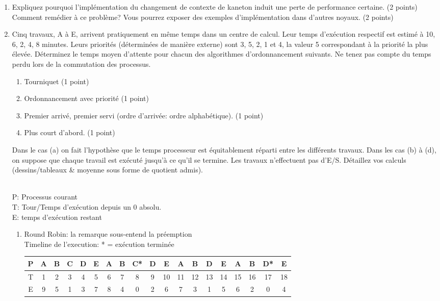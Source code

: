 \begin{enumerate}

\item Expliquez pourquoi l'implémentation du changement de contexte de
      kaneton induit une perte de performance certaine. (2 points) \\
      Comment remédier à ce problème? Vous pourrez exposer des exemples
      d'implémentation dans d'autres noyaux. (2 points)

\item Cinq travaux, A à E, arrivent pratiquement en même temps dans un centre de calcul. Leur temps d'exécution respectif est estimé à 10, 6, 2, 4, 8 minutes. Leurs priorités (déterminées de manière externe) sont 3, 5, 2, 1 et 4, la valeur 5 correspondant à la priorité la plus élevée. Déterminez le temps moyen d'attente pour chacun des algorithmes d'ordonnancement suivants. Ne tenez pas compte du temps perdu lors de la commutation des processus.
  \begin{enumerate}
  \item Tourniquet (1 point)
  \item Ordonnancement avec priorité (1 point)
  \item Premier arrivé, premier servi (ordre d'arrivée: ordre alphabétique). (1 point)
  \item Plus court d'abord. (1 point)
  \end{enumerate}
Dans le cas (a) on fait l'hypothèse que le temps processeur est équitablement réparti entre les différents travaux. Dans les cas (b) à (d), on suppose que chaque travail est exécuté jusqu'à ce qu'il se termine. Les travaux n'effectuent pas d'E/S. Détaillez vos calculs (dessins/tableaux \& moyenne sous forme de quotient admis).

\begin{correction}\\
P: Processus courant\\
T: Tour/Temps d’exécution depuis un 0 absolu.\\
E: temps d'exécution restant\\

\begin{enumerate}[label=(\alph*)]

\item Round Robin: la remarque sous-entend la préemption\\
      Timeline de l’execution: * = exécution terminée

      \begin{tabular}{|c||c|c|c|c|c|c|c|c|c|c|c|c|c|c|c|c|c|c|}
      \hline
      P & A & B & C & D & E & A & B & C{*} & D & E & A & B & D & E & A & B & D{*} & E\tabularnewline
      \hline
      T & 1 & 2 & 3 & 4 & 5 & 6 & 7 & 8 & 9 & 10 & 11 & 12 & 13 & 14 & 15 & 16 & 17 & 18\tabularnewline
      \hline
      E & 9 & 5 & 1 & 3 & 7 & 8 & 4 & 0 & 2 & 6 & 7 & 3 & 1 & 5 & 6 & 2 & 0 & 4\tabularnewline
      \hline
      \end{tabular}


\end{enumerate}
\end{correction}
\end{enumerate}
